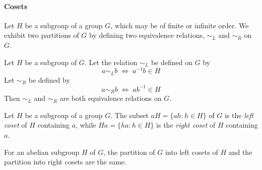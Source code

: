 \paragraph{Cosets}
Let $H$ be a subgroup of a group $G$, which may be of finite or
infinite order.  We exhibit two partitions of $G$ by defining two
equivalence relations, $\sim_L$ and $\sim_R$ on $G$.
\begin{theorem}
Let $H$ be a subgroup of $G$.  Let the relation $\sim_L$ be defined on
$G$ by 
\[
a \sim_L b \; \Leftrightarrow \; a^{-1}b \in H
\]
Let $\sim_R$ be defined by 
\[
a \sim_R b \; \Leftrightarrow \; ab^{-1} \in H
\]
Then $\sim_L$ and $\sim_R$ are both equivalence relations on $G$.
\end{theorem}

\begin{definition}[Cosets]
Let $H$ be a subgroup of a group $G$.  The subset 
$aH = \{ah : h\in H\}$ 
of $G$ is the \emph{left coset} of $H$ containing $a$, while
$Ha = \{ha : h\in H\}$
is the \emph{right coset} of $H$ containing $a$.
\end{definition}

\begin{proposition} For an abelian subgroup $H$ of $G$, the partition of $G$
into left cosets of $H$ and the partition into right cosets are the same.
\end{proposition}
%
